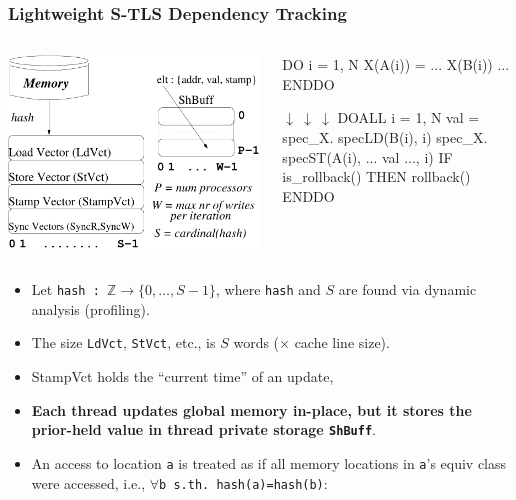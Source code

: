 \documentclass{beamer}
\newcommand{\emp}[1]{\textcolor{DikuRed}{ #1}}
\newcommand{\emphh}[1]{\textcolor{CosGreen}{ #1}}
\newcommand{\mymath}[1]{$ #1 $}
\begin{document}
\begin{frame}[fragile,t]
  \frametitle{Lightweight S-TLS Dependency Tracking}

\begin{columns}
\includegraphics[width=28ex]{Figures/FigsTLS/SpecMem1.pdf}
\vspace{-2ex}
\begin{colorcode}
\emp{DO} i = 1, N
  \emp{X(A(i))} = ... \emp{X(B(i))} ...
ENDDO

\mymath{\downarrow \ \downarrow \ \downarrow}
\emphh{DOALL} i = 1, N
  val = spec_X.\emphh{specLD(B(i), i)}
  spec_X.\emphh{specST(A(i), ... val ..., i)}
  IF is_rollback() THEN rollback()
ENDDO
\end{colorcode}
\end{columns}
\medskip\pause

\begin{itemize}
    \item Let {\tt hash : $\mathbb{Z} \rightarrow \{0,\ldots,S-1\}$},
            where {\tt hash} and $S$ are found via dynamic analysis (profiling).
    \item The size {\tt LdVct}, {\tt StVct}, etc., is $S$ words 
            ($\times$ cache line size).
    \item \emp{StampVct} holds the ``current time'' of an update,
    \item \emp{\bf Each thread updates global memory in-place, but it stores the
            prior-held value in thread private storage {\tt ShBuff}}. 
    \item An access to location {\tt a} is treated as if all 
            memory locations in {\tt a}'s equiv class were accessed, 
            i.e., {\tt$\forall$b s.th. hash(a)=hash(b)}: 
\end{itemize}

\end{frame}
\end{document}
